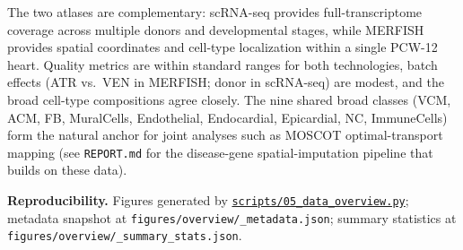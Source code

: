 \documentclass[11pt,a4paper]{article}
\begin{document}
\noindent
The two atlases are complementary: scRNA-seq provides full-transcriptome
coverage across multiple donors and developmental stages, while MERFISH
provides spatial coordinates and cell-type localization within a single
PCW-12 heart. Quality metrics are within standard ranges for both
technologies, batch effects (ATR vs.\ VEN in MERFISH; donor in scRNA-seq)
are modest, and the broad cell-type compositions agree closely. The
nine shared broad classes (VCM, ACM, FB, MuralCells, Endothelial,
Endocardial, Epicardial, NC, ImmuneCells) form the natural anchor for
joint analyses such as MOSCOT optimal-transport mapping
(see \texttt{REPORT.md} for the disease-gene spatial-imputation pipeline
that builds on these data).

\vspace{0.6em}
\noindent\textbf{Reproducibility.}\;\;
Figures generated by
\href{run:scripts/05_data_overview.py}{\texttt{scripts/05\_data\_overview.py}};
metadata snapshot at
\texttt{figures/overview/\_metadata.json};
summary statistics at
\texttt{figures/overview/\_summary\_stats.json}.
\end{document}
